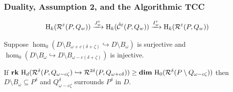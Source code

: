 \begin{frame}
  \frametitle{{\small Duality, Assumption 2, and the Algorithmic TCC}}

  \begin{small}
    \[ \mathrm{H}_k(\mathcal{R}^\varepsilon(P, Q_w))\xrightarrow{J_w^\varepsilon}\mathrm{H}_k(\check{\mathcal{C}}^\varepsilon(P, Q_w))\xrightarrow{I_w^\varepsilon}\mathrm{H}_k(\mathcal{R}^\varepsilon(P, Q_w))\]

    \begin{theorem}\label{thm:algo_tcc}
      Suppose $\hom_0(D\setminus B_{\omega+c(\delta+\zeta)}\hookrightarrow D\setminus B_\omega)$ is surjective and $\hom_0(D\setminus B_\omega\hookrightarrow D\setminus B_{\omega-c(\delta+\zeta)})$ is injective.

       If $\mathbf{rk}~\mathrm{H}_d(\mathcal{R}^\delta(P, Q_{\omega -c\zeta})\hookrightarrow \mathcal{R}^{2\delta}(P, Q_{\omega+c\delta})) \geq \mathbf{dim}~\mathrm{H}_0(\mathcal{R}^\delta(P\setminus Q_{\omega-c\zeta}))$ then $D\setminus B_\omega\subseteq P^\delta$ and $Q_{\omega-c\zeta}^\delta$ surrounds $P^\delta$ in $D$.
    \end{theorem}
  \end{small}

\end{frame}
